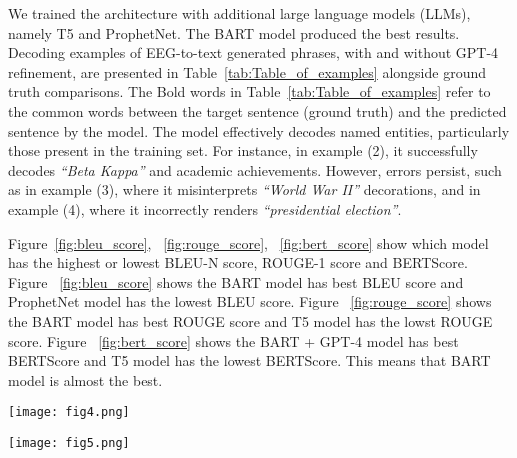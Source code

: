 \documentclass[journal]{IEEEtran}
\begin{document}
We trained the architecture with additional large language models (LLMs), namely T5 and ProphetNet. The BART model produced the best results. Decoding examples of EEG-to-text generated phrases, with and without GPT-4 refinement, are presented in Table~\ref{tab:Table_of_examples} alongside ground truth comparisons. The Bold words in  Table~\ref{tab:Table_of_examples} refer to the common words between the target sentence (ground truth) and the predicted sentence by the model. The model effectively decodes named entities, particularly those present in the training set. For instance, in example (2), it successfully decodes \textit{``Beta Kappa''} and academic achievements. However, errors persist, such as in example (3), where it misinterprets \textit{``World War II''} decorations, and in example (4), where it incorrectly renders \textit{``presidential election''}.

Figure~\ref{fig:bleu_score}, ~\ref{fig:rouge_score}, ~\ref{fig:bert_score} show which model has the highest or lowest BLEU-N score, ROUGE-1 score and BERTScore. Figure ~\ref{fig:bleu_score} shows the BART model has best BLEU score and ProphetNet model has the lowest BLEU score. Figure ~\ref{fig:rouge_score} shows the BART model has best ROUGE score and T5 model has the lowst ROUGE score. Figure ~\ref{fig:bert_score} shows the BART + GPT-4 model has best BERTScore and T5 model has the lowest BERTScore. This means that BART model is almost the best.


\begin{figure*}[!t]
	\renewcommand{\arraystretch}{1.3}
	\centering
	\caption\normalsize{}
	\label{fig:bleu_score}
	\texttt{[image: fig4.png]} %
	\vspace{-10pt} %
	
\end{figure*}



\begin{figure*}[!t]
	\renewcommand{\arraystretch}{1.3}
	
	\centering
	\caption\normalsize{}
	\label{fig:rouge_score}
	\texttt{[image: fig5.png]}     \vspace{-10pt} %
	
\end{figure*}
\end{document}
